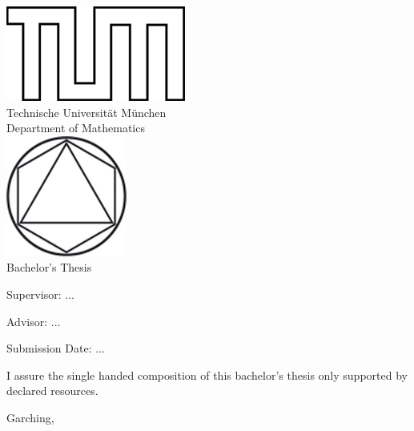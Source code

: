 \makeatletter
\begin{titlepage}
\begin{center}
\includegraphics{TUMlschwarz.png}\\[3mm]
\sf
{\Large
  Technische Universit\"at M\"unchen\\[5mm]
  Department of Mathematics\\[8mm]
}
\normalsize
\includegraphics{TUMlMschwarz.png}\\[15mm]

Bachelor's Thesis\\[15mm]

{\Huge
  \@title
}
\bigskip

\normalsize

\@author
\end{center}
\vspace*{75mm}

Supervisor: ...
\medskip

Advisor: ...
\medskip

Submission Date: ...

\end{titlepage}
\makeatother


\vspace*{150mm}

I assure the single handed composition of this bachelor's thesis only supported by declared resources.
\bigskip

Garching, 
\newpage
